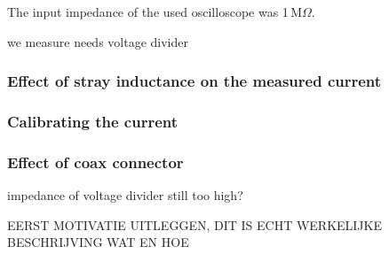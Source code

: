 The input impedance of the used oscilloscope was 1\,M$\Omega$.


we measure needs
voltage divider

\subsubsection{Effect of stray inductance on the measured current}

\subsubsection{Calibrating the current}

\subsubsection{Effect of coax connector}
impedance of voltage divider still too high?

EERST MOTIVATIE UITLEGGEN, DIT IS ECHT WERKELIJKE BESCHRIJVING WAT EN HOE


